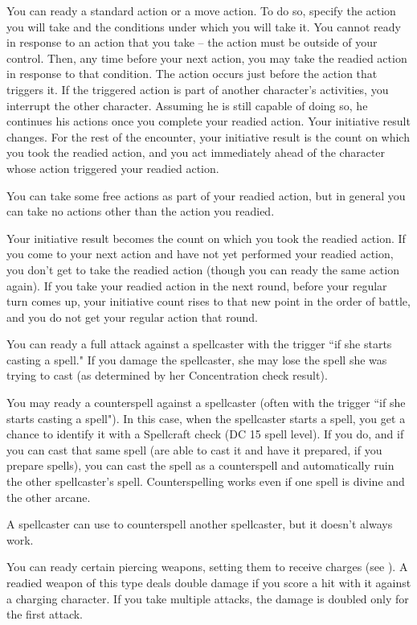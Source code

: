 You can ready a standard action or a move action. To do so, specify the action you will take and the conditions under which you will take it. You cannot ready in response to an action that you take -- the action must be outside of your control. Then, any time before your next action, you may take the readied action in response to that condition. The action occurs just before the action that triggers it. If the triggered action is part of another character's activities, you interrupt the other character. Assuming he is still capable of doing so, he continues his actions once you complete your readied action. Your initiative result changes. For the rest of the encounter, your initiative result is the count on which you took the readied action, and you act immediately ahead of the character whose action triggered your readied action.

You can take some free actions as part of your readied action, but in general you can take no actions other than the action you readied.

 Your initiative result becomes the count on which you took the readied action. If you come to your next action and have not yet performed your readied action, you don't get to take the readied action (though you can ready the same action again). If you take your readied action in the next round, before your regular turn comes up, your initiative count rises to that new point in the order of battle, and you do not get your regular action that round.

 You can ready a full attack against a spellcaster with the trigger ``if she starts casting a spell." If you damage
the spellcaster, she may lose the spell she was trying to cast (as determined by her Concentration check result).

 You may ready a counterspell against a spellcaster (often with the trigger ``if she starts casting a spell"). In this case, when the spellcaster starts a spell, you get a chance to identify it with a Spellcraft check (DC 15 \add spell level). If you do, and if you can cast that same spell (are able to cast it and have it prepared, if you prepare spells), you can cast the spell as a counterspell and automatically ruin the other spellcaster's spell. Counterspelling works even if one spell is divine and the other arcane.

A spellcaster can use  to counterspell another spellcaster, but it doesn't always work.

 You can ready certain piercing weapons, setting them to receive charges (see ). A readied weapon of this type deals double damage if you score a hit with it against a charging character. If you take multiple attacks, the damage is doubled only for the first attack.
